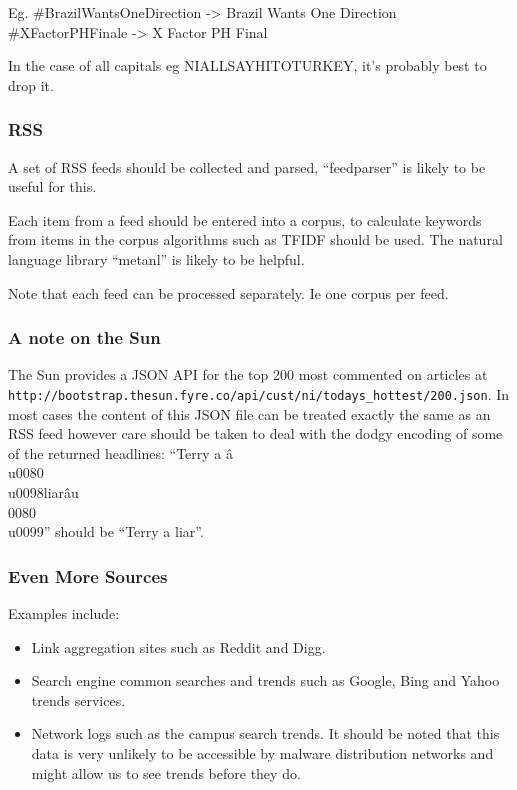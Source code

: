 Eg. \#BrazilWantsOneDirection -> Brazil Wants One Direction
\#XFactorPHFinale -> X Factor PH Final

In the case of all capitals eg NIALLSAYHITOTURKEY, it's probably best to drop it.

\subsubsection{RSS}
A set of RSS feeds should be collected and parsed, ``feedparser'' is likely to be useful for this.

Each item from a feed should be entered into a corpus, to calculate keywords from items in the corpus algorithms such as TFIDF should be used. The natural language library ``metanl'' is likely to be helpful.

Note that each feed can be processed separately. Ie one corpus per feed.

\subsubsection{A note on the Sun}
The Sun provides a JSON API for the top 200 most commented on articles at \verb`http://bootstrap.thesun.fyre.co/api/cust/ni/todays_hottest/200.json`. In most cases the content of this JSON file can be treated exactly the same as an RSS feed however care should be taken to deal with the dodgy encoding of some of the returned headlines: ``Terry a â\\u0080\\u0098liarâu\\0080\\u0099'' should be ``Terry a liar''.

\subsubsection{Even More Sources}
Examples include:
\begin{itemize}
    \item Link aggregation sites such as Reddit and Digg.
    \item Search engine common searches and trends such as Google, Bing and Yahoo trends services.
    \item Network logs such as the campus search trends. It should be noted that this data is very unlikely to be accessible by malware distribution networks and might allow us to see trends before they do.
\end{itemize}

